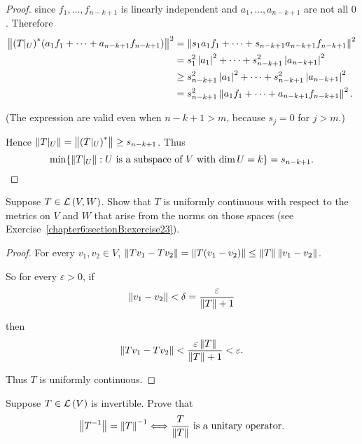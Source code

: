 \begin{proof}
    since $f_{1}, \ldots, f_{n-k+1}$ is linearly independent and $a_{1}, \ldots, a_{n-k+1}$ are not all $0$. Therefore
    \begin{align*}
        \left\Vert{{(T\vert_{U})}^{*}(a_{1}f_{1} + \cdots + a_{n-k+1}f_{n-k+1})}\right\Vert^{2} & = \left\Vert{s_{1}a_{1}f_{1} + \cdots + s_{n-k+1}a_{n-k+1}f_{n-k+1}}\right\Vert^{2}           \\
                                                                                & = s_{1}^{2}\left\vert{a_{1}}\right\vert^{2} + \cdots + s_{n-k+1}^{2}\left\vert{a_{n-k+1}}\right\vert^{2}        \\
                                                                                & \geq s_{n-k+1}^{2}\left\vert{a_{1}}\right\vert^{2} + \cdots + s_{n-k+1}^{2}\left\vert{a_{n-k+1}}\right\vert^{2} \\
                                                                                & = s_{n-k+1}^{2}\left\Vert{a_{1}f_{1} + \cdots + a_{n-k+1}f_{n-k+1}}\right\Vert^{2}.
    \end{align*}

    (The expression are valid even when $n-k+1 > m$, because $s_{j} = 0$ for $j > m$.)

    Hence $\left\Vert{T\vert_{U}}\right\Vert = \left\Vert{{(T\vert_{U})}^{*}}\right\Vert\geq s_{n-k+1}$. Thus
    \[
        \min\{ \left\Vert{T\vert_{U}}\right\Vert: \text{$U$ is a subspace of $V$ with $\dim U = k$} \} = s_{n-k+1}.
    \]
\end{proof}
\newpage

\begin{exercise}
    Suppose $T \in \mathcal{L}\left({V, W}\right)$. Show that $T$ is uniformly continuous with respect
    to the metrics on $V$ and $W$ that arise from the norms on those spaces (see Exercise~\ref{chapter6:sectionB:exercise23}).
\end{exercise}

\begin{proof}
    For every $v_{1}, v_{2}\in V$, $\left\Vert{Tv_{1} - Tv_{2}}\right\Vert = \left\Vert{T(v_{1} - v_{2})}\right\Vert \leq \left\Vert{T}\right\Vert\left\Vert{v_{1} - v_{2}}\right\Vert$.

    So for every $\varepsilon > 0$, if
    \[
        \left\Vert{v_{1} - v_{2}}\right\Vert < \delta = \frac{\varepsilon}{\left\Vert{T}\right\Vert + 1}
    \]

    then
    \[
        \left\Vert{Tv_{1} - Tv_{2}}\right\Vert < \frac{\varepsilon\left\Vert{T}\right\Vert}{\left\Vert{T}\right\Vert + 1} < \varepsilon.
    \]

    Thus $T$ is uniformly continuous.
\end{proof}
\newpage

\begin{exercise}
    Suppose $T\in\mathcal{L}\left({V}\right)$ is invertible. Prove that
    \[
        \left\Vert{T^{-1}}\right\Vert = \left\Vert{T}\right\Vert^{-1} \Longleftrightarrow \text{$\dfrac{T}{\left\Vert{T}\right\Vert}$ is a unitary operator}.
    \]
\end{exercise}

